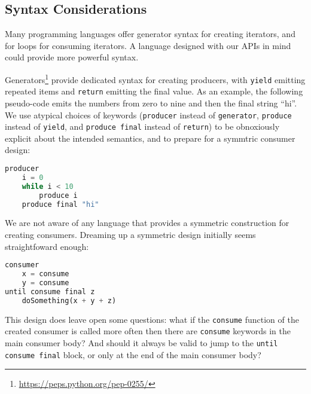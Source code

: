 \documentclass[sigplan,screen,10pt,anonymous,review]{acmart}
\begin{document}

\subsection{Syntax Considerations}\label{syntax}

Many programming languages offer generator syntax for creating iterators, and for loops for consuming iterators. A language designed with our APIs in mind could provide more powerful syntax.

Generators\footnote{\url{https://peps.python.org/pep-0255/}} provide dedicated syntax for creating producers, with \texttt{yield} emitting repeated items and \texttt{return} emitting the final value. As an example, the following pseudo-code emits the numbers from zero to nine and then the final string ``hi''. We use atypical choices of keywords (\texttt{producer} instead of \texttt{generator}, \texttt{produce} instead of \texttt{yield}, and \texttt{produce final} instead of \texttt{return}) to be obnoxiously explicit about the intended semantics, and to prepare for a symmtric consumer design:

\begin{lstlisting}[language=Python]
producer
    i = 0
    while i < 10
        produce i
    produce final "hi"
\end{lstlisting}

We are not aware of any language that provides a symmetric construction for creating consumers. Dreaming up a symmetric design initially seems straightfoward enough:

\begin{lstlisting}[language=Python]
consumer
    x = consume
    y = consume
until consume final z
    doSomething(x + y + z)
\end{lstlisting}

This design does leave open some questions: what if the \texttt{consume} function of the created consumer is called more often then there are \texttt{consume} keywords in the main consumer body? And should it always be valid to jump to the \texttt{until consume final} block, or only at the end of the main consumer body?
\end{document}
